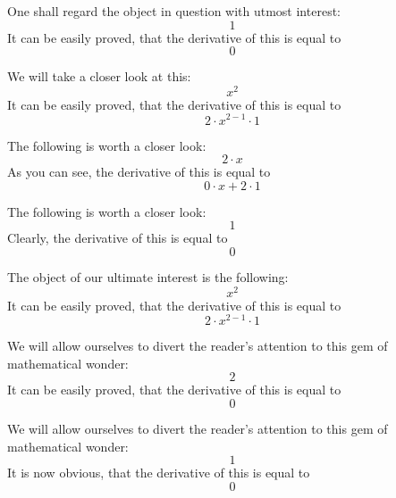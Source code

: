 \documentclass{article}
\begin{document}
One shall regard the object in question with utmost interest:
\begin{equation}
1 
\end{equation}
It can be easily proved, that the derivative of this is equal to
\begin{equation}
0 
\end{equation}

We will take a closer look at this:
\begin{equation}
x ^{2 } 
\end{equation}
It can be easily proved, that the derivative of this is equal to
\begin{equation}
2 \cdot x ^{2 - 1 } \cdot 1 
\end{equation}

The following is worth a closer look:
\begin{equation}
2 \cdot x 
\end{equation}
As you can see, the derivative of this is equal to
\begin{equation}
0 \cdot x + 2 \cdot 1 
\end{equation}

The following is worth a closer look:
\begin{equation}
1 
\end{equation}
Clearly, the derivative of this is equal to
\begin{equation}
0 
\end{equation}

The object of our ultimate interest is the following:
\begin{equation}
x ^{2 } 
\end{equation}
It can be easily proved, that the derivative of this is equal to
\begin{equation}
2 \cdot x ^{2 - 1 } \cdot 1 
\end{equation}

We will allow ourselves to divert the reader's attention to this gem of mathematical wonder:
\begin{equation}
2 
\end{equation}
It can be easily proved, that the derivative of this is equal to
\begin{equation}
0 
\end{equation}

We will allow ourselves to divert the reader's attention to this gem of mathematical wonder:
\begin{equation}
1 
\end{equation}
It is now obvious, that the derivative of this is equal to
\begin{equation}
0 
\end{equation}
\end{document}
